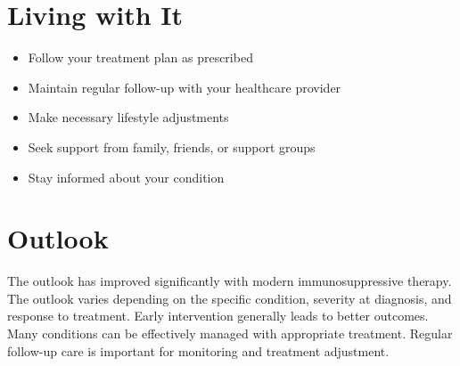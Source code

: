\section{Living with It}
\begin{itemize}[noitemsep]
  \item Follow your treatment plan as prescribed
  \item Maintain regular follow-up with your healthcare provider
  \item Make necessary lifestyle adjustments
  \item Seek support from family, friends, or support groups
  \item Stay informed about your condition
\end{itemize}
\section{Outlook}
The outlook has improved significantly with modern immunosuppressive therapy. The outlook varies depending on the specific condition, severity at diagnosis, and response to treatment. Early intervention generally leads to better outcomes. Many conditions can be effectively managed with appropriate treatment. Regular follow-up care is important for monitoring and treatment adjustment.

